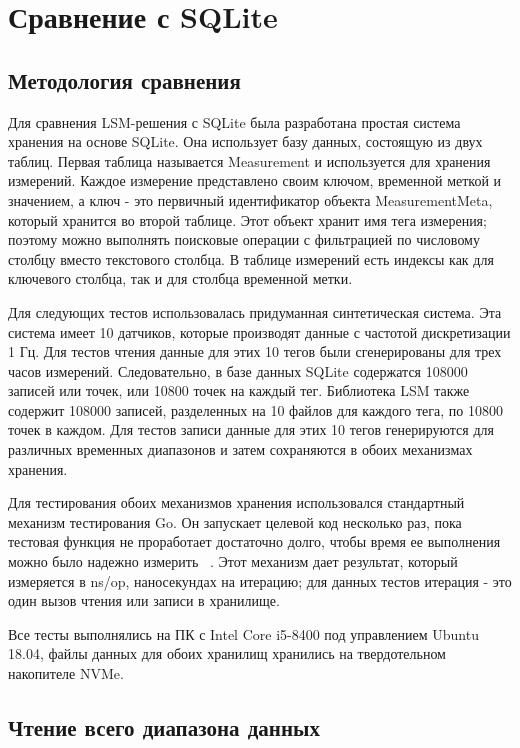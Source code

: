 \section{Сравнение с SQLite}

\subsection{Методология сравнения}

Для сравнения LSM-решения с SQLite была разработана простая система хранения на основе SQLite. Она использует базу данных, состоящую из двух таблиц. Первая таблица называется Measurement и используется для хранения измерений. Каждое измерение представлено своим ключом, временной меткой и значением, а ключ - это первичный идентификатор объекта MeasurementMeta, который хранится во второй таблице. Этот объект хранит имя тега измерения; поэтому можно выполнять поисковые операции с фильтрацией по числовому столбцу вместо текстового столбца. В таблице измерений есть индексы как для ключевого столбца, так и для столбца временной метки.

Для следующих тестов использовалась придуманная синтетическая система. Эта система имеет 10 датчиков, которые производят данные с частотой дискретизации 1 Гц. Для тестов чтения данные для этих 10 тегов были сгенерированы для трех часов измерений. Следовательно, в базе данных SQLite содержатся 108000 записей или точек, или 10800 точек на каждый тег. Библиотека LSM также содержит 108000 записей, разделенных на 10 файлов для каждого тега, по 10800 точек в каждом. Для тестов записи данные для этих 10 тегов генерируются для различных временных диапазонов и затем сохраняются в обоих механизмах хранения.

Для тестирования обоих механизмов хранения использовался стандартный механизм тестирования Go. Он запускает целевой код несколько раз, пока тестовая функция не проработает достаточно долго, чтобы время ее выполнения можно было надежно измерить ~\cite {go_benchmark}. Этот механизм дает результат, который измеряется в ns/op, наносекундах на итерацию; для данных тестов итерация - это один вызов чтения или записи в хранилище.

Все тесты выполнялись на ПК с Intel Core i5-8400 под управлением Ubuntu 18.04, файлы данных для обоих хранилищ хранились на твердотельном накопителе NVMe.

\subsection{Чтение всего диапазона данных}

